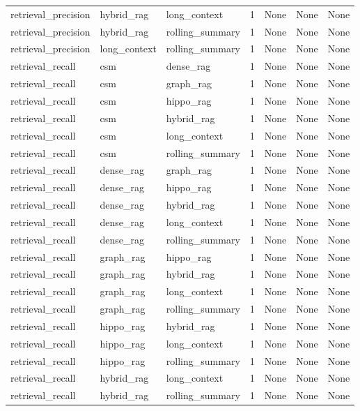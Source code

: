 \begin{tabular}{lllllll}
retrieval\_precision & hybrid\_rag & long\_context & 1 & None & None & None \\
retrieval\_precision & hybrid\_rag & rolling\_summary & 1 & None & None & None \\
retrieval\_precision & long\_context & rolling\_summary & 1 & None & None & None \\
retrieval\_recall & csm & dense\_rag & 1 & None & None & None \\
retrieval\_recall & csm & graph\_rag & 1 & None & None & None \\
retrieval\_recall & csm & hippo\_rag & 1 & None & None & None \\
retrieval\_recall & csm & hybrid\_rag & 1 & None & None & None \\
retrieval\_recall & csm & long\_context & 1 & None & None & None \\
retrieval\_recall & csm & rolling\_summary & 1 & None & None & None \\
retrieval\_recall & dense\_rag & graph\_rag & 1 & None & None & None \\
retrieval\_recall & dense\_rag & hippo\_rag & 1 & None & None & None \\
retrieval\_recall & dense\_rag & hybrid\_rag & 1 & None & None & None \\
retrieval\_recall & dense\_rag & long\_context & 1 & None & None & None \\
retrieval\_recall & dense\_rag & rolling\_summary & 1 & None & None & None \\
retrieval\_recall & graph\_rag & hippo\_rag & 1 & None & None & None \\
retrieval\_recall & graph\_rag & hybrid\_rag & 1 & None & None & None \\
retrieval\_recall & graph\_rag & long\_context & 1 & None & None & None \\
retrieval\_recall & graph\_rag & rolling\_summary & 1 & None & None & None \\
retrieval\_recall & hippo\_rag & hybrid\_rag & 1 & None & None & None \\
retrieval\_recall & hippo\_rag & long\_context & 1 & None & None & None \\
retrieval\_recall & hippo\_rag & rolling\_summary & 1 & None & None & None \\
retrieval\_recall & hybrid\_rag & long\_context & 1 & None & None & None \\
retrieval\_recall & hybrid\_rag & rolling\_summary & 1 & None & None & None \\

\end{tabular}
